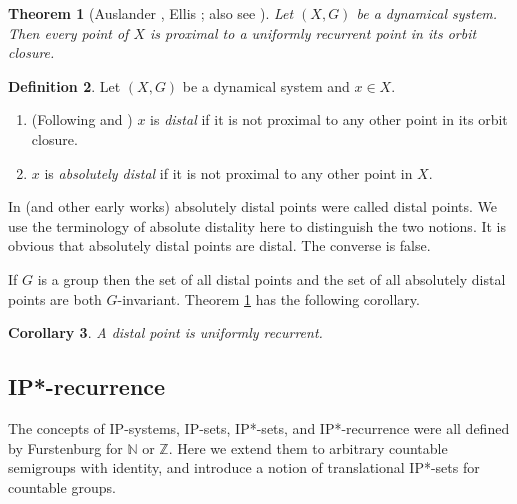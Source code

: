 \documentclass[11pt]{amsart}
\newtheorem{theorem}{Theorem}[section]
\newtheorem{corollary}[theorem]{Corollary}
\theoremstyle{definition}
\newtheorem{definition}[theorem]{Definition}
\numberwithin{equation}{section}
\theoremstyle{definition}
\begin{document}
\begin{theorem}[Auslander \cite{Auslander}, Ellis \cite{Ellis}; also see {\cite[Theorem 8.7]{Fur}}]\label{AE} Let $(X, G)$ be a dynamical system. Then every point of $X$ is proximal to a uniformly recurrent point in its orbit closure.
\end{theorem}

\begin{definition} Let $(X, G)$ be a dynamical system and $x\in X$.
\begin{enumerate}
\item (Following \cite{DLX} and \cite{XY}) $x$ is {\em distal} if it is not proximal to any other point in its orbit closure.
\item $x$ is {\em absolutely distal} if it is not proximal to any other point in $X$.
\end{enumerate}
\end{definition}

In \cite{Fur} (and other early works) absolutely distal points were called distal points. We use the terminology of absolute distality here to distinguish the two notions. It is obvious that absolutely distal points are distal. The converse is false.


If $G$ is a group then the set of all distal points and the set of all absolutely distal points are both $G$-invariant. Theorem \ref{AE} has the following corollary.

\begin{corollary}\label{minimal} A distal point is uniformly recurrent.
\end{corollary}


\subsection{IP*-recurrence}

The concepts of IP-systems, IP-sets, IP*-sets, and IP*-recurrence were all defined by Furstenburg \cite{Fur} for $\mathbb{N}$ or $\mathbb{Z}$. Here we extend them to arbitrary countable semigroups with identity, and introduce a notion of translational IP*-sets for countable groups.
\end{document}
